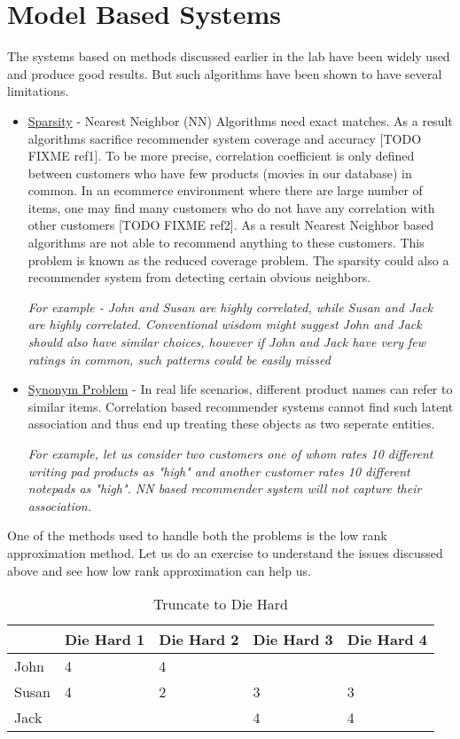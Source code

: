 % 
% 
% 
\section{Model Based Systems}
  The systems based on methods discussed earlier in the lab have been widely used and produce good results. But such algorithms have been shown to have several limitations. 
  \begin{itemize}
    \item \underline{Sparsity} - Nearest Neighbor (NN) Algorithms need exact matches. As a result algorithms sacrifice recommender system coverage and accuracy [TODO FIXME ref1]. To be more precise, correlation coefficient is only defined between customers who have few products (movies in our database) in common. In an ecommerce environment where there are large number of items, one may find many customers who do not have any correlation with other customers [TODO FIXME ref2]. As a result Nearest Neighbor based algorithms are not able to recommend anything to these customers. This problem is known as the reduced coverage problem. The sparsity could also a recommender system from detecting certain obvious neighbors. 

\textit{For example - John and Susan are highly correlated, while Susan and Jack are highly correlated. Conventional wisdom might suggest John and Jack should also have similar choices, however if John and Jack have very few ratings in common, such patterns could be easily missed}
    \item \underline{Synonym Problem} - In real life scenarios, different product names can refer to similar items. Correlation based recommender systems cannot find such latent association and thus end up treating these objects as two seperate entities. 

\textit{For example, let us consider two customers one of whom rates 10 different writing pad products as "high" and another customer rates 10 different notepads as "high". NN based recommender system will not capture their association.}
  \end{itemize}
  One of the methods used to handle both the problems is the low rank approximation method. Let us do an exercise to understand the issues discussed above and see how low rank approximation can help us. \\
  \begin{table}[]
  \centering
  \label{my-label}
  \begin{tabular}{|l|l|l|l|l|}
  \hline
      & Die Hard 1 & Die Hard 2 & Die Hard 3 & Die Hard 4 \\ \hline
John  & 4          & 4          &            &            \\ \hline
Susan & 4          & 2          & 3          & 3          \\ \hline
Jack  &            &            & 4          & 4          \\ \hline
  \end{tabular}
  \caption{Truncate to Die Hard}
  \label{Model-1}
  \end{table}
